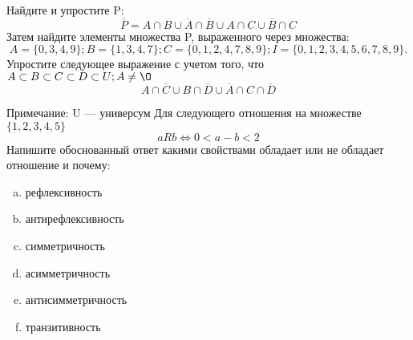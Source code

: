 \documentclass[10pt]{exam}
\begin{document}
\begin{questions}
\question
Найдите и упростите P:
\begin{equation*}
\overline{P} = A \cap B \cup \overline{A} \cap \overline{B} \cup A \cap C \cup \overline{B} \cap C
\end{equation*}
Затем найдите элементы множества P, выраженного через множества:
\begin{equation*}
A = \{0, 3, 4, 9\}; 
B = \{1, 3, 4, 7\};
C = \{0, 1, 2, 4, 7, 8, 9\};
I = \{0, 1, 2, 3, 4, 5, 6, 7, 8, 9\}.
\end{equation*}\question
Упростите следующее выражение с учетом того, что $A\subset B \subset C \subset D \subset U; A \neq \O$
\begin{equation*}
A \cap  \overline{C} \cup B \cap \overline{D} \cup  \overline{A} \cap C \cap  \overline{D}
\end{equation*}

Примечание: U — универсум\question
Для следующего отношения на множестве $\{1, 2, 3, 4, 5\}$ 
\begin{equation*}
aRb \iff 0 < a-b<2
\end{equation*}
Напишите обоснованный ответ какими свойствами обладает или не обладает отношение и почему:   
\begin{enumerate} [a)]\setcounter{enumi}{0}
\item рефлексивность
\item антирефлексивность
\item симметричность
\item асимметричность
\item антисимметричность
\item транзитивность
\end{enumerate}


\end{questions}
\end{document}
